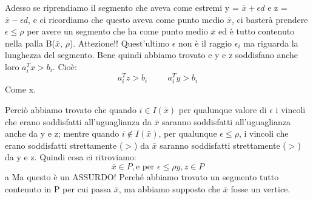 \begin{itemize}
\begin{figure}[h!]
    \end{figure}
    Adesso se riprendiamo il segmento che aveva come estremi y = $\bar{x} + \epsilon d$ e z = $\bar{x} - \epsilon d$, e ci ricordiamo che questo aveva come punto medio $\bar{x}$, ci basterà prendere $\epsilon \leq \rho$ per avere un segmento che ha come punto medio $\bar{x}$ ed è tutto contenuto nella palla B($\bar{x}$, $\rho$). Attezione!! Quest'ultimo $\epsilon$ non è il raggio $\epsilon_i$ ma riguarda la lunghezza del segmento. Bene quindi abbiamo trovato e y e z soddisfano anche loro $a_i^Tx > b_i$. Cioè:
    \begin{equation*}
        a_i^Tz > b_i \hspace{1cm} a_i^Ty > b_i
    \end{equation*}
    Come x.
\end{itemize}
Perciò abbiamo trovato che quando $i \in I(\bar{x})$ per qualunque valore di $\epsilon$ i vincoli che erano soddisfatti all'uguaglianza da $\bar{x}$ saranno soddisfatti all'uguaglianza anche da y e z; mentre quando $i \notin I(\bar{x})$, per qualunque $\epsilon \leq \rho$, i vincoli che erano soddisfatti strettamente ($>$) da $\bar{x}$ saranno soddisfatti strettamente ($>$) da y e z. Quindi cosa ci ritroviamo:
\begin{equation*}
    \bar{x} \in P, \text{e per $\epsilon \leq \rho y,z \in P$}
\end{equation*}a
Ma questo è un ASSURDO! Perché abbiamo trovato un segmento tutto contenuto in P per cui passa $\bar{x}$, ma abbiamo supposto che $\bar{x}$ fosse un vertice. 

